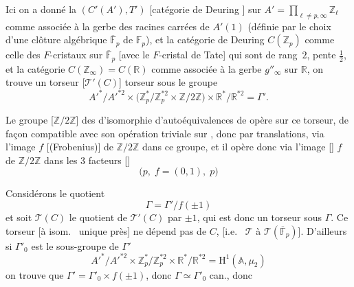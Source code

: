 \documentclass[11pt,a4paper]{article}
\begin{document}
Ici on a donné la \struck{\ill{}} $(C'(A'), T')$
[catégorie de Deuring ] sur
$A' = \prod_{\ell \neq p, \infty} \mathbb{Z}_{\ell}$ comme associée à la
gerbe des racines carrées de $A'(1)$ (définie par le choix d'une clôture
algébrique $\overline{\mathbb{F}}_{p}$ de $\mathbb{F}_{p}$), et la
catégorie de Deuring $C(\mathbb{Z}_{p})$ comme celle des $F$-cristaux sur
$\overline{\mathbb{F}}_{p}$ [avec le $F$-cristal de Tate]
 qui sont de rang~$2$, \struck{\ill{}} pente
$\tfrac{1}{2}$, et la  catégorie
$C(\mathbb{Z}_{\infty}) = C(\mathbb{R})$ comme associée à la gerbe
$g''_{\infty}$ \ill{} sur $\mathbb{R}$, on trouve un torseur
\struck{\ill{}} [$\mathcal{T}'(C)$]  torseur sous le
groupe
\[
  A'^{*}/A'^{*2} \times \bigl(\mathbb{Z}_{p}^{*}/\mathbb{Z}_{p}^{*2}
  \times \mathbb{Z}/2\mathbb{Z}\bigr) \times \mathbb{R}^{*}/\mathbb{R}^{*2}
  = \Gamma' .
\]

Le groupe [$\mathbb{Z}/2\mathbb{Z}$] des  d'isomorphie
d'autoéquivalences de  \ill{} opère sur ce torseur, de façon
compatible avec son opération triviale sur \ill{}, donc par translations,
via l'image $f$ [(Frobenius)] de $\mathbb{Z}/2\mathbb{Z}$ dans ce groupe,
et il opère donc via \struck{\ill{}} l'image [] $f$ de
$\mathbb{Z}/2\mathbb{Z}$ dans les $3$ facteurs []
\[
  \bigl(p, \; f = (0, 1), \; p\bigr)
\]

Considérons le quotient
\[
  \Gamma = \Gamma' / f(\pm 1)
\]
\struck{\ill{}} et soit $\mathcal{T}(C)$ le quotient de $\mathcal{T}'(C)$
par $\pm 1$, qui est donc un torseur sous $\Gamma$. Ce torseur [à isom.~
unique près] ne dépend pas de $C$, [i.e.\ 
$\mathcal{T}$ à $\mathcal{T}(\overline{\mathbb{F}}_{p})$]. D'ailleurs si
$\Gamma'_{0}$ est le sous-groupe de $\Gamma'$
\[
  A'^{*}/A'^{*2} \times \mathbb{Z}_{p}^{*}/\mathbb{Z}_{p}^{*2} \times
  \mathbb{R}^{*}/\mathbb{R}^{*2} = \mathrm{H}^{1}(\mathbb{A}, \mu_{2})
\]
on trouve que $\Gamma' = \Gamma'_{0} \times f(\pm 1)$, donc
$\Gamma \simeq \Gamma'_{0}$ can., donc
\end{document}
